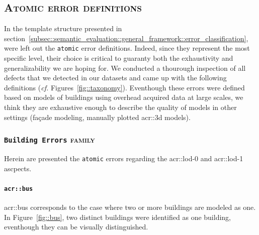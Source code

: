     \subsection{\textsc{Atomic error definitions}}
        \label{subsec::semantic_evaluation::overhead::atomic}
        In the template structure presented in section~\ref{subsec::semantic_evaluation::general_framework::error_classification}, were left out the \texttt{atomic} error definitions.
        Indeed, since they represent the most specific level, their choice is critical to guaranty both the exhaustivity and generalizability we are hoping for.
        We conducted a thourough inspection of all defects that we detected in our datasets and came up with the following definitions (\textit{cf.} Figures~\ref{fig::taxonomy}).
        Eventhough these errors were defined based on models of buildings using overhead acquired data at large scales, we think they are exhaustive enough to describe the quality of models in other settings (fa\c{c}ade modeling, manually plotted \gls{acr::3d} models).

        \subsubsection{\texttt{Building Errors} \textsc{family}}
            Herein are presented the \texttt{atomic} errors regarding the \gls{acr::lod}-0 and \gls{acr::lod}-1 ascpects.

            \paragraph{\texttt{\acrlong*{acr::bus}}}
                \gls{acr::bus} corresponds to the case where two or more buildings are modeled as one.
                In Figure~\ref{fig::bus}, two distinct buildings were identified as one building, eventhough they can be visually distinguished.\\

